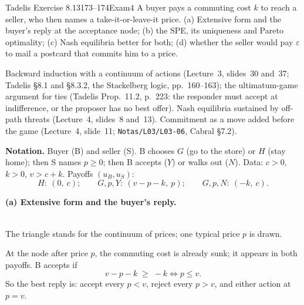 \begin{exsol}{Tadelis Exercise 8.13}{173--174}{Exam}{4}
\asked A buyer pays a commuting cost $k$ to reach a seller, who then names a take-it-or-leave-it
price. (a) Extensive form and the buyer's reply at the acceptance node; (b) the SPE, its
uniqueness and Pareto optimality; (c) Nash equilibria better for both; (d) whether the seller
would pay $\varepsilon$ to mail a postcard that commits him to a price.

\method Backward induction with a continuum of actions (Lecture~3, slides~30 and~37; Tadelis
\S8.1 and \S8.3.2, the Stackelberg logic, pp.~160--163); the ultimatum-game argument for ties
(Tadelis Prop.~11.2, p.~223: the responder must accept at indifference, or the proposer has no best
offer). Nash equilibria sustained by off-path threats (Lecture~4, slides~8 and~13). Commitment as a
move added before the game (Lecture~4, slide~11; \texttt{Notas/L03/L03-06}, Cabral \S7.2).

\solution
\textbf{Notation.} Buyer (B) and seller (S). B chooses $G$ (go to the store) or $H$ (stay
home); then S names $p \ge 0$; then B accepts ($Y$) or walks out ($N$). Data: $c > 0$,
$k > 0$, $v > c + k$. Payoffs $(u_B, u_S)$:
\[
  H:\ (0,\ c);\qquad G,p,Y:\ (v - p - k,\ p);\qquad G,p,N:\ (-k,\ c).
\]

\textbf{(a) Extensive form and the buyer's reply.}
\begin{center}
\\[2pt]
{\footnotesize The triangle stands for the continuum of prices; one typical price $p$ is drawn.}
\end{center}
At the node after price $p$, the commuting cost is already sunk; it appears in both payoffs. B
accepts if
\[
  v - p - k \;\ge\; -k \iff p \le v .
\]
So the best reply is: accept every $p < v$, reject every $p > v$, and either action at $p = v$.


\end{exsol}
